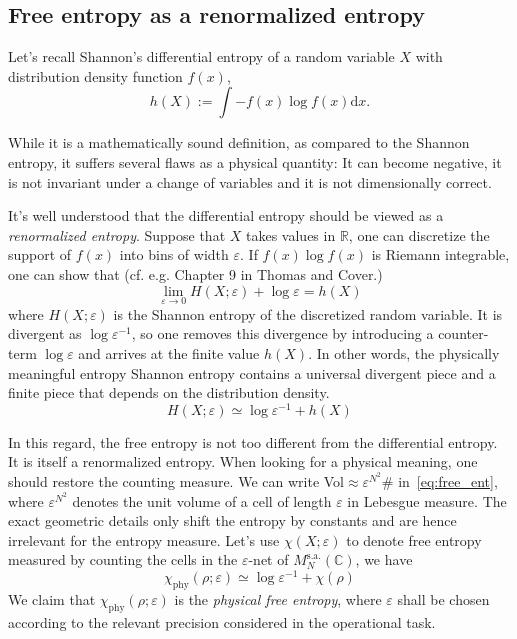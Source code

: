 \documentclass[11pt,letterpaper]{article}
\newcommand{\dd}{\mathrm{d}}
\def\eps{\varepsilon}
\begin{document}
\subsection{Free entropy as a renormalized entropy}
Let's recall Shannon's differential entropy of a random variable $X$ with distribution density function $f(x)$,
\begin{equation}
    h(X) := \int -f(x)\log f(x)\dd x.
\end{equation}

While it is a mathematically sound definition, as compared to the Shannon entropy, it suffers several flaws as a physical quantity: It can become negative, it is not invariant under a change of variables and it is not dimensionally correct. 

It's well understood that the differential entropy should be viewed as a \emph{renormalized entropy}. Suppose that $X$ takes values in $\mathbb{R}$, one can discretize the support of $f(x)$ into bins of width $\eps$. If $f(x)\log f(x)$ is Riemann integrable, one can show that (cf. e.g. Chapter 9 in Thomas and Cover.)
\begin{equation}
   \lim_{\eps\to 0} H(X;\eps)+\log\eps = h(X)
\end{equation}
where $H(X;\eps)$ is the Shannon entropy of the discretized random variable. It is divergent as $\log\eps^{-1}$, so one removes this divergence by introducing a counter-term $\log\eps$ and arrives at the finite value $h(X)$. In other words, the physically meaningful entropy Shannon entropy contains a universal divergent piece and a finite piece that depends on the distribution density. 
\begin{equation}
    H(X;\eps)\simeq\log\eps^{-1} + h(X)
\end{equation}

In this regard, the free entropy is not too different from the differential entropy. It is itself a renormalized entropy. When looking for a physical meaning, one should restore the counting measure. We can write Vol$\approx\eps^{N^2}\#$ in~\eqref{eq:free_ent}, where $\eps^{N^2}$ denotes the unit volume of a cell of length $\eps$ in Lebesgue measure. The exact geometric details only shift the entropy by constants and are hence irrelevant for the entropy measure. Let's use $\chi(X;\eps)$ to denote free entropy measured by counting the cells in the $\eps$-net of $M_N^\mathrm{s.a.}(\mathbb{C})$, we have
\begin{equation}\label{eq:physical_free_ent}
    \chi_\mathrm{phy}(\rho;\eps)\simeq\log\eps^{-1} + \chi(\rho)
\end{equation}
We claim that $\chi_\mathrm{phy}(\rho;\eps)$ is the \emph{physical free entropy}, where $\eps$ shall be chosen according to the relevant precision considered in the operational task.\\
\end{document}
